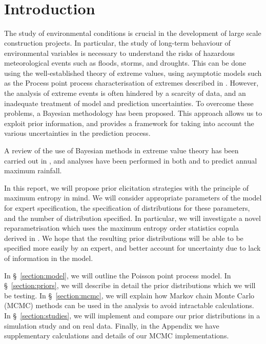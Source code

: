 \documentclass{article}
\title{%
	\vspace{-15mm}\Huge{\hwtitle}\\
	\Large\vspace{1mm}\hwname\\
	\Large\vspace{1mm}\small{\itshape\hwdate}\vspace{-15mm}}
\date{}
\author{}
\begin{document}
%	
\maketitle
%
\section{Introduction}
%

%
The study of environmental conditions is crucial
in the development of large scale construction projects.
In particular, the study of long-term behaviour
of environmental variables is necessary to understand
the risks of hazardous meteorological events such as
floods, storms, and droughts.
This can be done using the well-established theory of extreme values,
using asymptotic models such as the Process point process characterisation
of extremes described in \cite{coles2001}.
However, the analysis of extreme events is often hindered
by a scarcity of data, and an inadequate treatment
of model and prediction uncertainties.
To overcome these problems, a Bayesian methodology has been proposed.
This approach allows us to exploit prior information,
and provides a framework for taking into account the various uncertainties
in the prediction process.
%

%
A review of the use of Bayesian methods in extreme value theory
has been carried out in \cite{coles1996review},
and analyses have been performed in both
\cite{coles2003} and \cite{coles1996}
to predict annual maximum rainfall.
%

%
In this report, we will propose prior elicitation strategies
with the principle of maximum entropy in mind.
We will consider appropriate parameters of the model for expert specification,
the specification of distributions for these parameters,
and the number of distribution specified.
In particular, we will investigate a novel reparametrisation which
uses the maximum entropy order statistics copula derived in
\cite{butucea2018}. We hope that the resulting prior
distributions will be able to be specified more easily by an expert, and
better account for uncertainty due to lack of information in the model.
%

%
In \S~\ref{section:model}, we will outline the Poisson point process model.
In \S~\ref{section:priors}, we will describe in detail
the prior distributions which we will be testing.
In \S~\ref{section:mcmc}, we will explain how Markov chain Monte Carlo (MCMC)
methods can be used in the analysis to avoid intractable calculations.
In \S~\ref{section:studies}, we will implement and compare our prior
distributions in a simulation study and on real data.
Finally, in the Appendix we have supplementary calculations
and details of our MCMC implementations.
%
\end{document}
